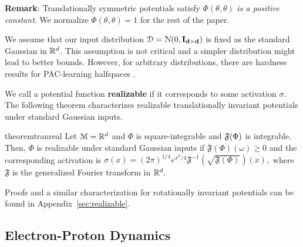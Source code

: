 {\bf Remark}: Translationally symmetric potentials satisfy
$\Phi(\theta,\theta)$ {\it is a positive constant}. We normalize
$\Phi(\theta,\theta) = 1$ for the rest of the paper.
  
We assume that our input distribution
$\mathcal{D} = \mathcal{N}(0, {\bf I_{d\times d}})$ is fixed as the
standard Gaussian in ${\mathbb{R}}^d$. This assumption is not critical and a
simpler distribution might lead to better bounds. However, for
arbitrary distributions, there are hardness results for PAC-learning
halfspaces \cite{klivans2006cryptographic}.

We call a potential function {\bf realizable} if it corresponds to
some activation $\sigma$.  The following theorem characterizes
realizable translationally invariant potentials under standard
Gaussian inputs.
%
\begin{restatable}{theorem}{tranreal}
\label{thm:tranReal}
Let $\mathcal{M} = {\mathbb{R}}^d$ and $\Phi$ is square-integrable and
${\mathfrak{F}}(\Phi)$ is integrable. Then, $\Phi$ is realizable under standard
Gaussian inputs if $\mathfrak{F}(\Phi)(\omega) \geq 0$ and the
corresponding activation is
$\sigma(x) =
(2\pi)^{1/4}e^{x^2/4}\mathfrak{F}^{-1}(\sqrt{\mathfrak{F}(\Phi)})(x),
$ where $\mathfrak{F}$ is the generalized Fourier transform in ${\mathbb{R}}^d.$
\end{restatable}
%
Proofs and a similar characterization for rotationally invariant
potentials can be found in Appendix~\ref{sec:realizable}.

%
\subsection{Electron-Proton Dynamics}

%
%

